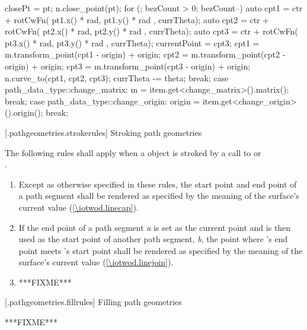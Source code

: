 \begin{codeblock}
{{{{      closePt = pt;
      n.close_point(pt);
    }
    for (; bezCount > 0; bezCount--) {
      auto cpt1 = ctr + rotCwFn({ pt1.x() * rad, pt1.y() * rad }, currTheta);
      auto cpt2 = ctr + rotCwFn({ pt2.x() * rad, pt2.y() * rad }, currTheta);
      auto cpt3 = ctr + rotCwFn({ pt3.x() * rad, pt3.y() * rad }, currTheta);
      currentPoint = cpt3;
      cpt1 = m.transform_point(cpt1 - origin) + origin;
      cpt2 = m.transform_point(cpt2 - origin) + origin;
      cpt3 = m.transform_point(cpt3 - origin) + origin;
      n.curve_to(cpt1, cpt2, cpt3);
      currTheta -= theta;
    }
  } break;
  case path_data_type::change_matrix:
  {
    m = item.get<change_matrix>().matrix();
  } break;
  case path_data_type::change_origin:
  {
    origin = item.get<change_origin>().origin();
  } break;
  }
}
\end{codeblock}

 [\iotwod.pathgeometries.strokerules] {Stroking path geometries}

\pnum
The following rules shall apply when a  object is stroked by a call to  or\\
.

\begin{enumerate}
	\item Except as otherwise specified in these rules, the start point and end point of a path segment shall be rendered as specified by the meaning of the surface's current  value (\ref{\iotwod.linecap}).
	
	\item If the end point of a path segment \textit{a} is set as the current point and is then used as the start point of another path segment, \textit{b}, the point where 's end point meets 's start point shall be rendered as specified by the meaning of the surface's current  value (\ref{\iotwod.linejoin}).
	
	\item ***FIXME***
\end{enumerate}

 [\iotwod.pathgeometries.fillrules] {Filling path geometries}

\pnum
***FIXME***
